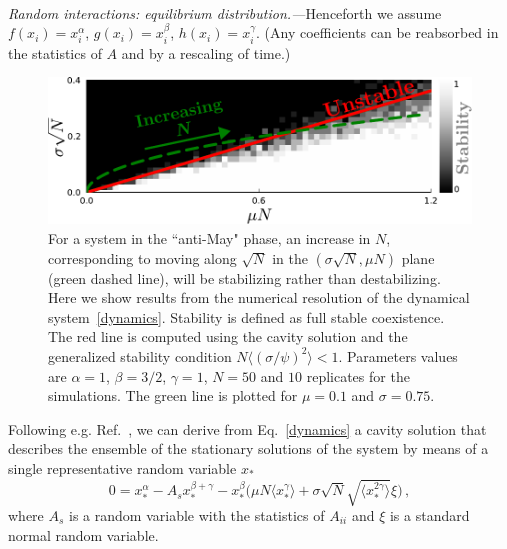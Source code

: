 \documentclass[
 prl,
 twocolumn,
 amsmath,
 amssymb,
 aps,
]{revtex4-2}
\begin{document}
\paragraph*{}
\emph{Random interactions: equilibrium distribution.---}Henceforth we assume $f(x_i)=x_i^{\alpha}$, $g(x_i)=x_i^{\beta}$, $h(x_i)=x_i^{\gamma}$. 
(Any coefficients can be reabsorbed in the statistics of $A$ and by a rescaling of time.)
\begin{figure}[t!]
    \includegraphics[width=.45\textwidth]{beta1_5-S50-N10-diversity-increase.pdf}
    \caption{For a system in the ``anti-May" phase, an increase in $N$,
    corresponding to moving along $\sqrt{N}$ in the $(\sigma \sqrt{N},\mu N)$ plane (green dashed line), will be stabilizing rather than destabilizing.
    Here we show results from the numerical resolution of the dynamical system~\eqref{dynamics}. Stability is defined as full stable coexistence. The red line is computed using the cavity solution and the generalized stability condition $N\langle (\sigma/\psi)^2\rangle < 1$.
    Parameters values are $\alpha=1$, $\beta=3/2$,
    $\gamma=1$, $N=50$ and $10$ replicates for the simulations. The green line is plotted for $\mu=0.1$ and $\sigma=0.75$.}
    \label{fig: stability line + sims}
\end{figure}
Following e.g. Ref.~\cite{Roy2019}, we can derive from Eq.~\eqref{dynamics} a cavity solution that describes the ensemble of the stationary solutions of the system by means of a single representative random variable $x_*$
\begin{equation}
    0 = x_*^{\alpha}-A_sx_*^{\beta+\gamma}-x_*^{\beta}\big( \mu N \langle x_*^{\gamma}\rangle + \sigma\sqrt{N} \sqrt{\langle x_*^{2\gamma}\rangle}\xi\big) \, ,
\label{eq: dmft}
\end{equation}
where $A_s$ is a random variable with the statistics of $A_{ii}$ and $\xi$ is a standard normal random variable. 
\end{document}
